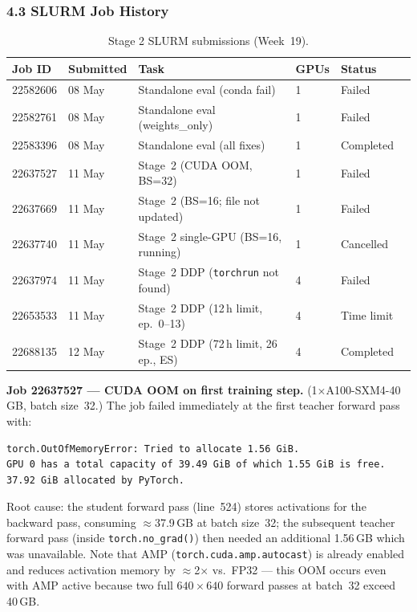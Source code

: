 \subsubsection*{4.3 SLURM Job History}

\begin{table}[h]
\centering
\caption{Stage 2 SLURM submissions (Week~19).}
\label{tab:stage2_jobs}
\begin{tabular}{lp{2.0cm}p{4.0cm}lll}
\hline
\textbf{Job ID} & \textbf{Submitted} & \textbf{Task} &
\textbf{GPUs} & \textbf{Status} \\
\hline
22582606 & 08 May & Standalone eval (conda fail)     & 1 & Failed \\
22582761 & 08 May & Standalone eval (weights\_only)  & 1 & Failed \\
22583396 & 08 May & Standalone eval (all fixes)      & 1 & Completed \\
22637527 & 11 May & Stage~2 (CUDA OOM, BS=32)            & 1 & Failed    \\
22637669 & 11 May & Stage~2 (BS=16; file not updated)    & 1 & Failed    \\
22637740 & 11 May & Stage~2 single-GPU (BS=16, running)  & 1 & Cancelled \\
22637974 & 11 May & Stage~2 DDP (\texttt{torchrun} not found) & 4 & Failed      \\
22653533 & 11 May & Stage~2 DDP (12\,h limit, ep.~0--13)     & 4 & Time limit  \\
22688135 & 12 May & Stage~2 DDP (72\,h limit, 26 ep., ES)    & 4 & Completed   \\
\hline
\end{tabular}
\end{table}

\textbf{Job 22637527 — CUDA OOM on first training step.}
(1$\times$A100-SXM4-40\,GB, batch size~32.) The job failed
immediately at the first teacher forward pass with:
\begin{verbatim}
torch.OutOfMemoryError: Tried to allocate 1.56 GiB.
GPU 0 has a total capacity of 39.49 GiB of which 1.55 GiB is free.
37.92 GiB allocated by PyTorch.
\end{verbatim}
Root cause: the student forward pass (line~524) stores activations
for the backward pass, consuming $\approx$37.9\,GB at batch
size~32; the subsequent teacher forward pass (inside
\texttt{torch.no\_grad()}) then needed an additional 1.56\,GB
which was unavailable. Note that AMP (\texttt{torch.cuda.amp.autocast})
is already enabled and reduces activation memory by $\approx$2$\times$
vs.\ FP32 — this OOM occurs even with AMP active because two full
$640\times640$ forward passes at batch~32 exceed 40\,GB.

